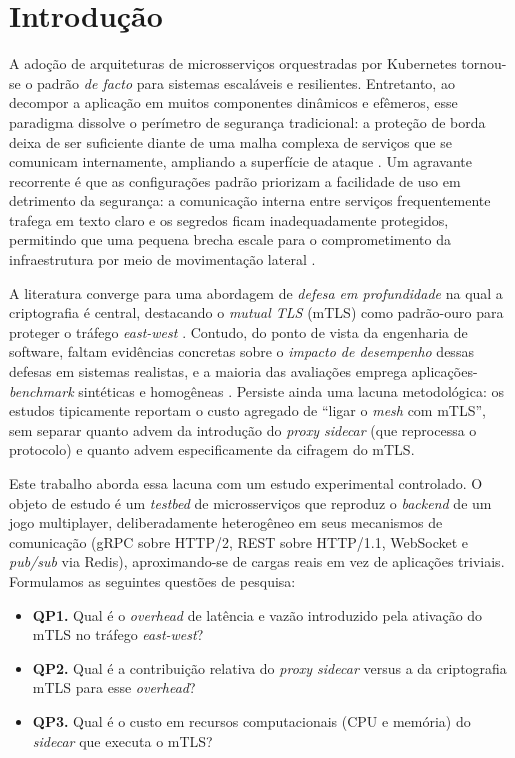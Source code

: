 \documentclass[12pt]{article}
\begin{document}
\section{Introdu\c{c}\~ao}

A ado\c{c}\~ao de arquiteturas de microsservi\c{c}os orquestradas por Kubernetes tornou-se o padr\~ao \textit{de facto} para sistemas escal\'aveis e resilientes. Entretanto, ao decompor a aplica\c{c}\~ao em muitos componentes din\^amicos e ef\^emeros, esse paradigma dissolve o per\'imetro de seguran\c{c}a tradicional: a prote\c{c}\~ao de borda deixa de ser suficiente diante de uma malha complexa de servi\c{c}os que se comunicam internamente, ampliando a superf\'icie de ataque \cite{flora2024, baarzi2020}. Um agravante recorrente \'e que as configura\c{c}\~oes padr\~ao priorizam a facilidade de uso em detrimento da seguran\c{c}a: a comunica\c{c}\~ao interna entre servi\c{c}os frequentemente trafega em texto claro e os segredos ficam inadequadamente protegidos, permitindo que uma pequena brecha escale para o comprometimento da infraestrutura por meio de movimenta\c{c}\~ao lateral \cite{bufalino2025, gunathilake2024}.

A literatura converge para uma abordagem de \textit{defesa em profundidade} na qual a criptografia \'e central, destacando o \textit{mutual TLS} (mTLS) como padr\~ao-ouro para proteger o tr\'afego \textit{east-west} \cite{fernandez2019, falcao2025}. Contudo, do ponto de vista da engenharia de software, faltam evid\^encias concretas sobre o \emph{impacto de desempenho} dessas defesas em sistemas realistas, e a maioria das avalia\c{c}\~oes emprega aplica\c{c}\~oes-\textit{benchmark} sint\'eticas e homog\^eneas \cite{zhu2023, bremlerbarr2024}. Persiste ainda uma lacuna metodol\'ogica: os estudos tipicamente reportam o custo agregado de ``ligar o \textit{mesh} com mTLS'', sem separar quanto advem da introdu\c{c}\~ao do \textit{proxy sidecar} (que reprocessa o protocolo) e quanto advem especificamente da cifragem do mTLS.

Este trabalho aborda essa lacuna com um estudo experimental controlado. O objeto de estudo \'e um \textit{testbed} de microsservi\c{c}os que reproduz o \textit{backend} de um jogo multiplayer, deliberadamente heterog\^eneo em seus mecanismos de comunica\c{c}\~ao (gRPC sobre HTTP/2, REST sobre HTTP/1.1, WebSocket e \textit{pub/sub} via Redis), aproximando-se de cargas reais em vez de aplica\c{c}\~oes triviais. Formulamos as seguintes quest\~oes de pesquisa:

\begin{itemize}
  \item \textbf{QP1.} Qual \'e o \textit{overhead} de lat\^encia e vaz\~ao introduzido pela ativa\c{c}\~ao do mTLS no tr\'afego \textit{east-west}?
  \item \textbf{QP2.} Qual \'e a contribui\c{c}\~ao relativa do \textit{proxy sidecar} versus a da criptografia mTLS para esse \textit{overhead}?
  \item \textbf{QP3.} Qual \'e o custo em recursos computacionais (CPU e mem\'oria) do \textit{sidecar} que executa o mTLS?
\end{itemize}
\end{document}
